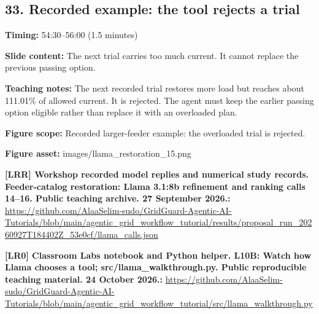 \documentclass[10pt,letterpaper]{article}
\begin{document}
\subsection*{33. Recorded example: the tool rejects a trial}
\textbf{Timing:} 54:30--56:00 (1.5 minutes)\par
\textbf{Slide content:} The next trial carries too much current.
It cannot replace the previous passing option.\par
\textbf{Teaching notes:} The next recorded trial restores more load but reaches about 111.01\% of allowed current. It is rejected. The agent must keep the earlier passing option eligible rather than replace it with an overloaded plan.\par
\textbf{Figure scope:} Recorded larger-feeder example: the overloaded trial is rejected.\par
\textbf{Figure asset:} images/llama\_restoration\_15.png\par
\textbf{[LRR] Workshop recorded model replies and numerical study records. Feeder-catalog restoration: Llama 3.1:8b refinement and ranking calls 14--16. Public teaching archive. 27 September 2026.:} \href{https://github.com/AlaaSelim-sudo/GridGuard-Agentic-AI-Tutorials/blob/main/agentic_grid_workflow_tutorial/results/proposal_run_20260927T184402Z_53e0cf/llama_calls.json}{\small\ttfamily https:/\allowbreak{}/\allowbreak{}github.\allowbreak{}com/\allowbreak{}AlaaSelim-\allowbreak{}sudo/\allowbreak{}GridGuard-\allowbreak{}Agentic-\allowbreak{}AI-\allowbreak{}Tutorials/\allowbreak{}blob/\allowbreak{}main/\allowbreak{}agentic\_\allowbreak{}grid\_\allowbreak{}workflow\_\allowbreak{}tutorial/\allowbreak{}results/\allowbreak{}proposal\_\allowbreak{}run\_\allowbreak{}20260927T184402Z\_\allowbreak{}53e0cf/\allowbreak{}llama\_\allowbreak{}calls.\allowbreak{}json}\par
\textbf{[LR0] Classroom Labs notebook and Python helper. L10B: Watch how Llama chooses a tool; src/llama\_walkthrough.py. Public reproducible teaching material. 24 October 2026.:} \href{https://github.com/AlaaSelim-sudo/GridGuard-Agentic-AI-Tutorials/blob/main/agentic_grid_workflow_tutorial/src/llama_walkthrough.py}{\small\ttfamily https:/\allowbreak{}/\allowbreak{}github.\allowbreak{}com/\allowbreak{}AlaaSelim-\allowbreak{}sudo/\allowbreak{}GridGuard-\allowbreak{}Agentic-\allowbreak{}AI-\allowbreak{}Tutorials/\allowbreak{}blob/\allowbreak{}main/\allowbreak{}agentic\_\allowbreak{}grid\_\allowbreak{}workflow\_\allowbreak{}tutorial/\allowbreak{}src/\allowbreak{}llama\_\allowbreak{}walkthrough.\allowbreak{}py}\par
\par\medskip
\end{document}
